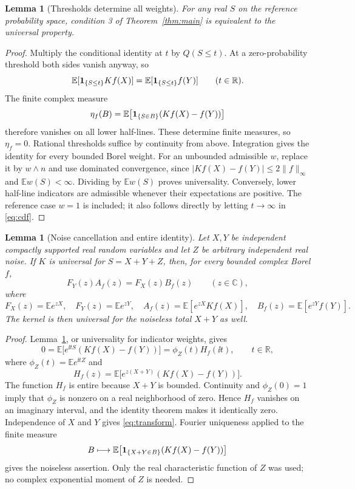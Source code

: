 \documentclass[11pt,a4paper]{article}
\newtheorem{lemma}[theorem]{Lemma}
\theoremstyle{remark}\newtheorem*{ednote}{Editorial note (ProveIt, 2026-10-01)}
\newcommand{\E}{\mathbb E}\newcommand{\R}{\mathbb R}\newcommand{\C}{\mathbb C}\newcommand{\N}{\mathbb N}
\begin{document}
\begin{lemma}[Thresholds determine all weights]\label{lem:thresholds}
For any real $S$ on the reference probability space, condition 3 of Theorem~\ref{thm:main} is equivalent to the universal property.
\end{lemma}
\begin{proof}
Multiply the conditional identity at $t$ by $Q(S\le t)$. At a zero-probability threshold both sides vanish anyway, so
\begin{equation}\label{eq:cdf}
 \E[\ind_{\{S\le t\}}Kf(X)]
 =\E[\ind_{\{S\le t\}}f(Y)]\qquad(t\in\R).
\end{equation}
The finite complex measure
\[
 \eta_f(B)=\E\bigl[\ind_{\{S\in B\}}(Kf(X)-f(Y))\bigr]
\]
therefore vanishes on all lower half-lines. These determine finite measures, so $\eta_f=0$. Rational thresholds suffice by continuity from above. Integration gives the identity for every bounded Borel weight. For an unbounded admissible $w$, replace it by $w\wedge n$ and use dominated convergence, since $|Kf(X)-f(Y)|\le2\|f\|_\infty$ and $\E w(S)<\infty$. Dividing by $\E w(S)$ proves universality. Conversely, lower half-line indicators are admissible whenever their expectations are positive. The reference case $w=1$ is included; it also follows directly by letting $t\to\infty$ in \eqref{eq:cdf}.
\end{proof}

\begin{lemma}[Noise cancellation and entire identity]\label{lem:noise}
Let $X,Y$ be independent compactly supported real random variables and let $Z$ be arbitrary independent real noise. If $K$ is universal for $S=X+Y+Z$, then, for every bounded complex Borel $f$,
\begin{equation}\label{eq:transform}
 F_Y(z)A_f(z)=F_X(z)B_f(z)\qquad(z\in\C),
\end{equation}
where
\[
 F_X(z)=\E e^{zX},\quad F_Y(z)=\E e^{zY},\quad
 A_f(z)=\E[e^{zX}Kf(X)],\quad B_f(z)=\E[e^{zY}f(Y)].
\]
The kernel is then universal for the noiseless total $X+Y$ as well.
\end{lemma}
\begin{proof}
Lemma~\ref{lem:thresholds}, or universality for indicator weights, gives
\[
 0=\E\bigl[e^{\ii tS}(Kf(X)-f(Y))\bigr]
   =\phi_Z(t)H_f(\ii t),\qquad t\in\R,
\]
where $\phi_Z(t)=\E e^{\ii tZ}$ and
\[
 H_f(z)=\E\bigl[e^{z(X+Y)}(Kf(X)-f(Y))\bigr].
\]
The function $H_f$ is entire because $X+Y$ is bounded. Continuity and $\phi_Z(0)=1$ imply that $\phi_Z$ is nonzero on a real neighborhood of zero. Hence $H_f$ vanishes on an imaginary interval, and the identity theorem makes it identically zero. Independence of $X$ and $Y$ gives \eqref{eq:transform}. Fourier uniqueness applied to the finite measure
\[
 B\longmapsto\E\bigl[\ind_{\{X+Y\in B\}}(Kf(X)-f(Y))\bigr]
\]
gives the noiseless assertion. Only the real characteristic function of $Z$ was used; no complex exponential moment of $Z$ is needed.
\end{proof}
\end{document}
